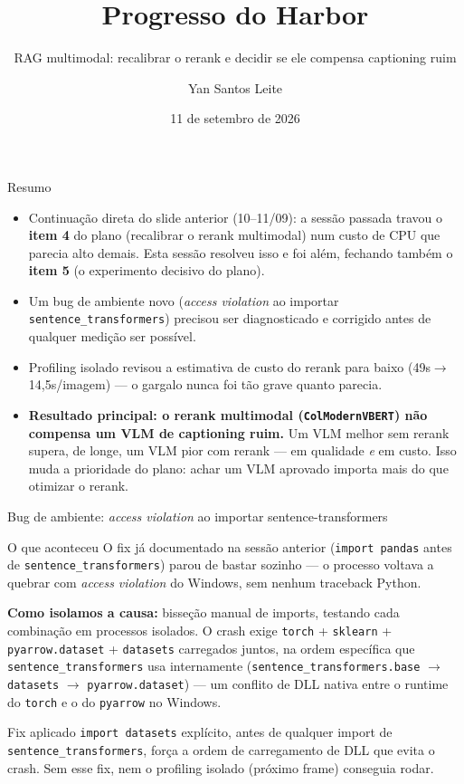 \documentclass{beamer}
\title{Progresso do Harbor}
\subtitle{RAG multimodal: recalibrar o rerank e decidir se ele compensa captioning ruim}
\author{Yan Santos Leite}
\date{11 de setembro de 2026}
\newenvironment{numerobloco}[1]{\begin{block}{#1}}{\end{block}}
\newenvironment{decisaobloco}[1]{\begin{alertblock}{#1}}{\end{alertblock}}
\begin{document}
\frame{\titlepage}

\begin{frame}{Resumo}
  \begin{itemize}
    \item Continuação direta do slide anterior (10--11/09): a sessão passada travou o
      \textbf{item 4} do plano (recalibrar o rerank multimodal) num custo de CPU que
      parecia alto demais. Esta sessão resolveu isso e foi além, fechando também o
      \textbf{item 5} (o experimento decisivo do plano).
    \item Um bug de ambiente novo (\emph{access violation} ao importar
      \texttt{sentence\_transformers}) precisou ser diagnosticado e corrigido antes de
      qualquer medição ser possível.
    \item Profiling isolado revisou a estimativa de custo do rerank para baixo
      (49s$\to$14,5s/imagem) — o gargalo nunca foi tão grave quanto parecia.
    \item \textbf{Resultado principal: o rerank multimodal (\texttt{ColModernVBERT}) não
      compensa um VLM de captioning ruim.} Um VLM melhor sem rerank supera, de longe, um
      VLM pior com rerank — em qualidade \emph{e} em custo. Isso muda a prioridade do
      plano: achar um VLM aprovado importa mais do que otimizar o rerank.
  \end{itemize}
\end{frame}

\begin{frame}{Bug de ambiente: \emph{access violation} ao importar sentence-transformers}
  \small
  \begin{numerobloco}{O que aconteceu}
    O fix já documentado na sessão anterior (\texttt{import pandas} antes de
    \texttt{sentence\_transformers}) parou de bastar sozinho — o processo voltava a
    quebrar com \emph{access violation} do Windows, sem nenhum traceback Python.
  \end{numerobloco}

  \pause
  \textbf{Como isolamos a causa:} bisseção manual de imports, testando cada combinação
  em processos isolados. O crash exige \texttt{torch} + \texttt{sklearn} +
  \texttt{pyarrow.dataset} + \texttt{datasets} carregados juntos, na ordem específica
  que \texttt{sentence\_transformers} usa internamente (\texttt{sentence\_transformers.base}
  $\to$ \texttt{datasets} $\to$ \texttt{pyarrow.dataset}) — um conflito de DLL nativa
  entre o runtime do \texttt{torch} e o do \texttt{pyarrow} no Windows.

  \pause
  \begin{decisaobloco}{Fix aplicado}
    \texttt{import datasets} explícito, antes de qualquer import de
    \texttt{sentence\_transformers}, força a ordem de carregamento de DLL que evita o
    crash. Sem esse fix, nem o profiling isolado (próximo frame) conseguia rodar.
  \end{decisaobloco}
\end{frame}
\end{document}
